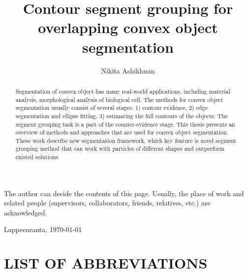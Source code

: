 \documentclass{lutmscthesis}[2010/09/22]
\title{Contour segment grouping for overlapping convex object segmentation}
\author{Nikita Ashikhmin}
\begin{document}

\maketitle
\newpage

\begin{abstract}
Segmentation of convex object has many real-world applications, including material analysis, morphological analysis of biological cell. The methods for convex object segmentation usually consist of several stages: 1) contour evidence, 2) edge segmentation and ellipse fitting, 3) estimating the full contours of the objects. The segment grouping task is a part of the counter-evidence stage. This thesis presents an overview of methods and approaches that are used for convex object segmentation. These work describe new segmentation framework, which key feature is novel segment grouping method that can work with particles of different shapes and outperform existed solutions.
\end{abstract}


\begin{preface}

The author can decide the contents of this page. Usually, the place of work and related people (supervisors, collaborators, friends, relatives, etc.) are acknowledged.


Lappeenranta, \today

\end{preface}


\renewcommand\refname{REFERENCES}
\renewcommand\contentsname{CONTENTS}

\pagestyle{masters}
\newpage



\tableofcontents



\section*{LIST OF ABBREVIATIONS}
\end{document}
